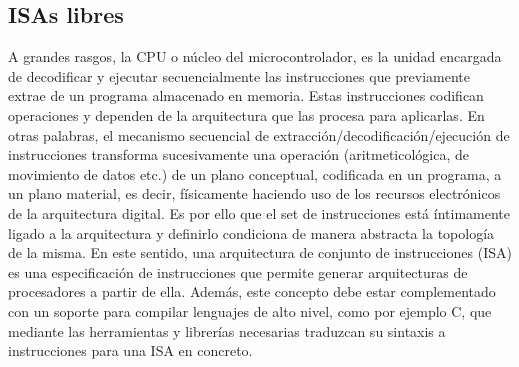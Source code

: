 \subsection{ISAs libres}

\label{isas-free}

A grandes rasgos, la CPU o núcleo del microcontrolador, es la unidad encargada de decodificar y ejecutar secuencialmente las instrucciones que previamente extrae de un programa almacenado en memoria.
Estas instrucciones codifican operaciones y dependen de la arquitectura que las procesa para aplicarlas.
En otras palabras, el mecanismo secuencial de extracción/decodificación/ejecución de instrucciones transforma sucesivamente una operación (aritmeticológica, de movimiento de datos etc.) de un plano conceptual, codificada en un programa, a un plano material, es decir, físicamente haciendo uso de los recursos electrónicos de la arquitectura digital. 
Es por ello que el set de instrucciones está íntimamente ligado a la arquitectura y definirlo condiciona de manera abstracta la topología de la misma. 
En este sentido, una arquitectura de conjunto de instrucciones (ISA) es una especificación de instrucciones que permite generar arquitecturas de procesadores a partir de ella.
Además, este concepto debe estar complementado con un soporte para compilar lenguajes de alto nivel, como por ejemplo C, que mediante las herramientas y librerías necesarias traduzcan su sintaxis a instrucciones para una ISA en concreto.


